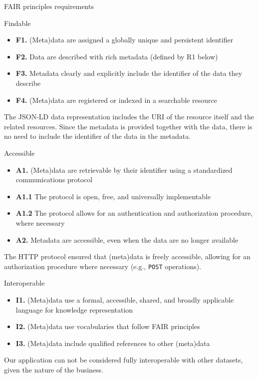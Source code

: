 \begin{frame}[allowframebreaks]{FAIR\autocite{Wilkinson_2016} principles requirements}
	\begin{block}{Findable}
		\begin{itemize}
			\item \textbf{F1.} (Meta)data are assigned a globally unique and persistent identifier
			\item \textbf{F2.} Data are described with rich metadata (defined by R1 below)
			\item \textcolor{UNITSCherry}{\textbf{F3.} Metadata clearly and explicitly include the identifier of the data they describe}
			\item \textcolor{UNITSCherry}{\textbf{F4.} (Meta)data are registered or indexed in a searchable resource}
		\end{itemize}
	\end{block}

	The JSON-LD data representation includes the URI of the resource itself and the related resources.
	Since the metadata is provided together with the data, there is no need to include
	the identifier of the data in the metadata.

	\framebreak

	\begin{block}{Accessible}
		\begin{itemize}
			\item \textbf{A1.} (Meta)data are retrievable by their identifier using a standardized communications protocol
			\item \textbf{A1.1} The protocol is open, free, and universally implementable
			\item \textbf{A1.2} The protocol allows for an authentication and authorization procedure, where necessary
			\item \textcolor{UNITSCherry}{\textbf{A2.} Metadata are accessible, even when the data are no longer available}
		\end{itemize}
	\end{block}

	The HTTP protocol ensured that (meta)data is freely accessible, allowing for an
	authorization procedure where necessary (e.g., \texttt{POST} operations).

	\framebreak

	\begin{block}{Interoperable}
		\begin{itemize}
			\item \textbf{I1.} (Meta)data use a formal, accessible, shared, and broadly applicable language for knowledge representation
			\item \textbf{I2.} (Meta)data use vocabularies that follow FAIR principles
			\item \textcolor{UNITSCherry}{\textbf{I3.} (Meta)data include qualified references to other (meta)data}
		\end{itemize}
	\end{block}
	Our application can not be considered fully interoperable with other datasets, given the nature of the business.


\end{frame}
